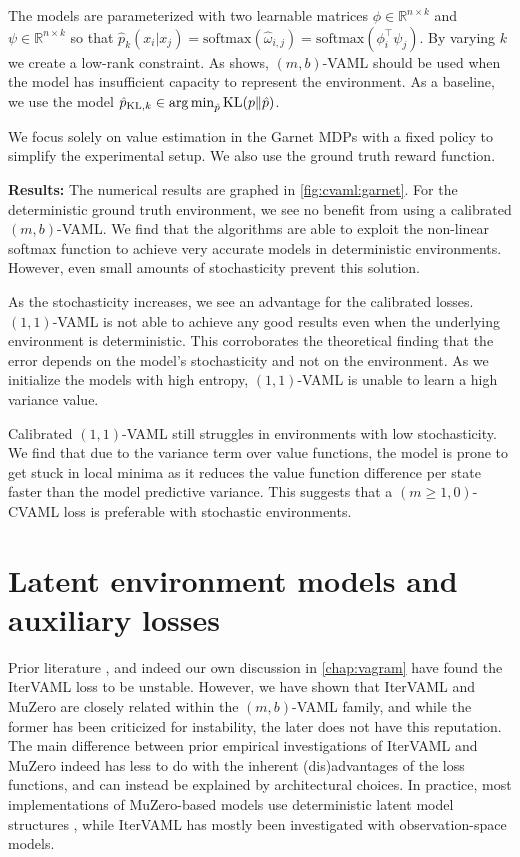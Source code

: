 The models are parameterized with two learnable matrices $\phi \in \mathbb{R}^{n\times k}$ and $\psi \in \mathbb{R}^{n\times k}$ so that $\hat{p}_k(x_i| x_j)  = \mathrm{softmax}(\hat{\omega}_{i,j}) = \mathrm{softmax}(\phi_i^\top \psi_j)$.
By varying $k$ we create a low-rank constraint.
As \textcite{vaml} shows, $(m,b)$-VAML should be used when the model has insufficient capacity to represent the environment.
As a baseline, we use the model $\hat{p}_{\mathrm{KL}, k}\in \operatorname*{arg\,min}_{\hat{p}} \mathrm{KL}(p\|\hat{p})$.

We focus solely on value estimation in the Garnet MDPs with a fixed policy to simplify the experimental setup.
We also use the ground truth reward function.

\textbf{Results:}
The numerical results are graphed in \autoref{fig:cvaml:garnet}.
For the deterministic ground truth environment, we see no benefit from using a calibrated $(m,b)$-VAML.
We find that the algorithms are able to exploit the non-linear softmax function to achieve very accurate models in deterministic environments.
However, even small amounts of stochasticity prevent this solution.

As the stochasticity increases, we see an advantage for the calibrated losses.
$(1,1)$-VAML is not able to achieve any good results even when the underlying environment is deterministic.
This corroborates the theoretical finding that the error depends on the model's stochasticity and not on the environment.
As we initialize the models with high entropy, $(1,1)$-VAML is unable to learn a high variance value.

Calibrated $(1,1)$-VAML still struggles in environments with low stochasticity.
We find that due to the variance term over value functions, the model is prone to get stuck in local minima as it reduces the value function difference per state faster than the model predictive variance.
This suggests that a $(m\geq1,0)$-CVAML loss is preferable with stochastic environments.

\section{Latent environment models and auxiliary losses}
Prior literature \parencite{lovatto2020decision}, and indeed our own discussion in \autoref{chap:vagram} have found the IterVAML loss to be unstable.
However, we have shown that IterVAML and MuZero are closely related within the $(m,b)$-VAML family, and while the former has been criticized for instability, the later does not have this reputation.
The main difference between prior empirical investigations of IterVAML and MuZero indeed has less to do with the inherent (dis)advantages of the loss functions, and can instead be explained by architectural choices.
In practice, most implementations of MuZero-based models use deterministic latent model structures \parencite{schrittwieser2020mastering,ye2021mastering,hansen2022temporal,antonoglou2022planning}, while IterVAML has mostly been investigated with observation-space models.

